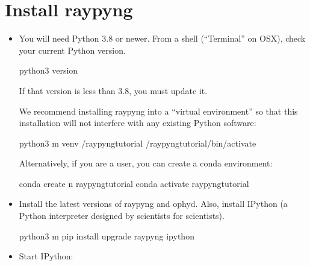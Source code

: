 \documentclass[letterpaper,10pt,english]{sphinxmanual}
\begin{document}
\section{Install raypyng}
\label{\detokenize{install_raypyng:install-raypyng}}\begin{itemize}
\item {} 
\sphinxAtStartPar
You will need Python 3.8 or newer. From a shell (“Terminal” on OSX),
check your current Python version.

\begin{sphinxVerbatim}[commandchars=\\\{\}]
python3 \PYGZhy{}\PYGZhy{}version
\end{sphinxVerbatim}

\sphinxAtStartPar
If that version is less than 3.8, you must update it.

\sphinxAtStartPar
We recommend installing raypyng into a “virtual environment” so that this
installation will not interfere with any existing Python software:

\begin{sphinxVerbatim}[commandchars=\\\{\}]
python3 \PYGZhy{}m venv \PYGZti{}/raypyng\PYGZhy{}tutorial
 \PYGZti{}/raypyng\PYGZhy{}tutorial/bin/activate
\end{sphinxVerbatim}

\sphinxAtStartPar
Alternatively, if you are a
 user,
you can create a conda environment:

\begin{sphinxVerbatim}[commandchars=\\\{\}]
conda create \PYGZhy{}n raypyng\PYGZhy{}tutorial 
conda activate raypyng\PYGZhy{}tutorial
\end{sphinxVerbatim}

\item {} 
\sphinxAtStartPar
Install the latest versions of raypyng and ophyd. Also, install IPython
(a Python interpreter designed by scientists for scientists).

\begin{sphinxVerbatim}[commandchars=\\\{\}]
python3 \PYGZhy{}m pip install \PYGZhy{}\PYGZhy{}upgrade raypyng ipython
\end{sphinxVerbatim}

\item {} 
\sphinxAtStartPar
Start IPython:


\end{itemize}
\end{document}
